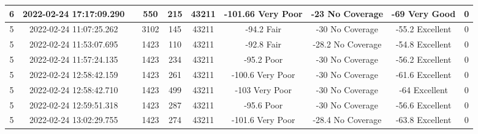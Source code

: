 \begin{longtable*}{|c|c|c|c|c|c|c|c|c|c|}
6&2022-02-24 17:17:09.290&&550&215&43211& -101.66   Very Poor   & -23       No Coverage & -69       Very Good   & 0\\\hline
{}5&2022-02-24 11:07:25.262&&3102&145&43211& -94.2     Fair        & -30       No Coverage & -55.2     Excellent   & 0\\\hline
{}5&2022-02-24 11:53:07.695&&1423&110&43211& -92.8     Fair        & -28.2     No Coverage & -54.8     Excellent   & 0\\\hline
{}5&2022-02-24 11:57:24.135&&1423&234&43211& -95.2     Poor        & -30       No Coverage & -56.2     Excellent   & 0\\\hline
{}5&2022-02-24 12:58:42.159&&1423&261&43211& -100.6    Very Poor   & -30       No Coverage & -61.6     Excellent   & 0\\\hline
{}5&2022-02-24 12:58:42.710&&1423&499&43211& -103      Very Poor   & -30       No Coverage & -64       Excellent   & 0\\\hline
{}5&2022-02-24 12:59:51.318&&1423&287&43211& -95.6     Poor        & -30       No Coverage & -56.6     Excellent   & 0\\\hline
{}5&2022-02-24 13:02:29.755&&1423&274&43211& -101.6    Very Poor   & -28.4     No Coverage & -63.8     Excellent   & 0\\\hline

\end{longtable*}
